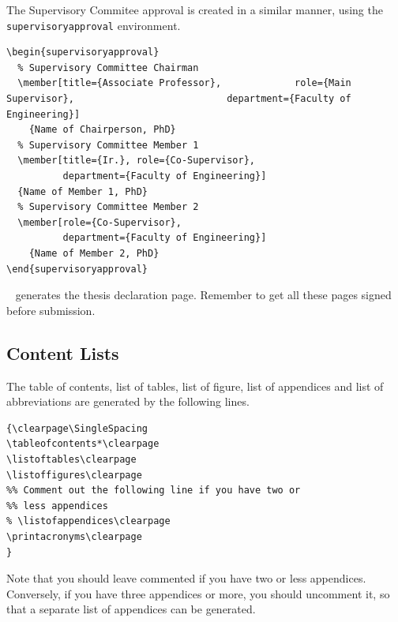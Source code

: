 \documentclass[a4paper,nofonts,raggedright,titlepage,openany]{tufte-book}
\begin{document}
The Supervisory Commitee approval  is created in a similar manner, using the \texttt{supervisoryapproval} environment.

\begin{verbatim}
\begin{supervisoryapproval}
  % Supervisory Committee Chairman
  \member[title={Associate Professor},             role={Main Supervisor},                           department={Faculty of Engineering}]
    {Name of Chairperson, PhD}
  % Supervisory Committee Member 1
  \member[title={Ir.}, role={Co-Supervisor},
          department={Faculty of Engineering}]
  {Name of Member 1, PhD}
  % Supervisory Committee Member 2
  \member[role={Co-Supervisor},
          department={Faculty of Engineering}]
    {Name of Member 2, PhD}
\end{supervisoryapproval}

\end{verbatim}

\texttt{\declarationpage
} generates the thesis declaration page. Remember to get all these pages signed before submission.

\subsection{Content Lists}
\label{sec:content:lists}

The table of contents, list of tables, list of figure, list of appendices  and list of abbreviations are generated by the following lines.

\begin{verbatim}
{\clearpage\SingleSpacing
\tableofcontents*\clearpage
\listoftables\clearpage
\listoffigures\clearpage
%% Comment out the following line if you have two or 
%% less appendices
% \listofappendices\clearpage
\printacronyms\clearpage
}
\end{verbatim}

Note that you should leave \texttt{\listofappendices} commented if you have two or less appendices.  Conversely,  if you have three appendices or more, you should uncomment it, so that a separate list of appendices can be generated.
\end{document}
